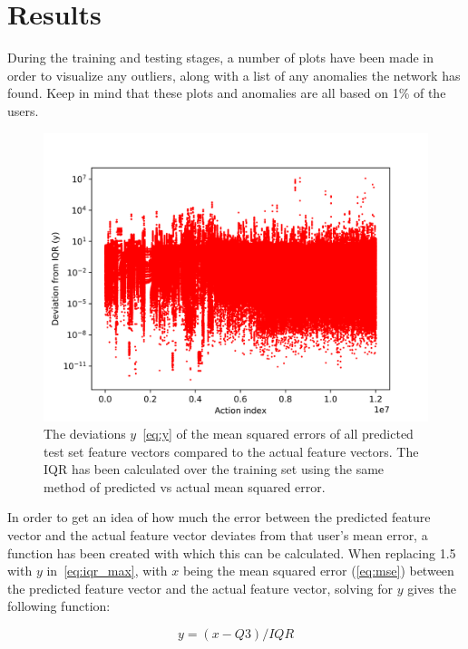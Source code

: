 \chapter{Results}\label{ch:results}

During the training and testing stages, a number of plots have been made in order to visualize any outliers, along with a list of any anomalies the network has found. Keep in mind that these plots and anomalies are all based on 1\% of the users.

\begin{figure}
	\begin{center}
		\includegraphics[scale=0.1]{results/all_deviations}
	\end{center}
	\caption{The deviations \(y\)~\ref{eq:y} of the mean squared errors of all predicted test set feature vectors compared to the actual feature vectors. The IQR has been calculated over the training set using the same method of predicted vs actual mean squared error.~\label{fig:iqr_scale}}
\end{figure}

In order to get an idea of how much the error between the predicted feature vector and the actual feature vector deviates from that user's mean error, a function has been created with which this can be calculated. When replacing 1.5 with \(y\) in~\ref{eq:iqr_max}, with \(x\) being the mean squared error (\ref{eq:mse}) between the predicted feature vector and the actual feature vector, solving for \(y\) gives the following function:

\begin{equation} \label{eq:y}
y = (x - Q3) / IQR
\end{equation}

